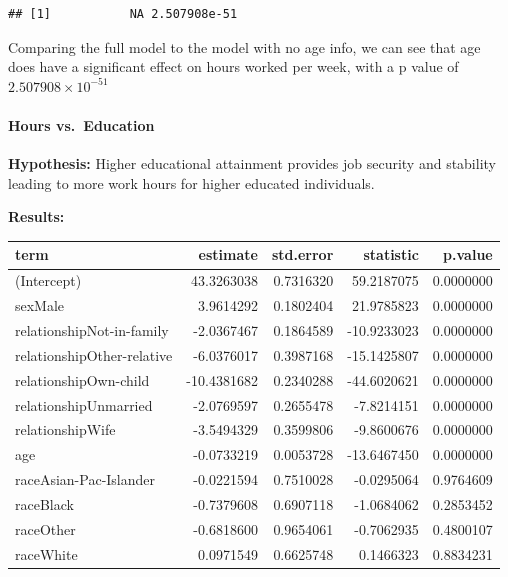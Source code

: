 \documentclass[]{article}
\newenvironment{Shaded}{\begin{snugshade}}{\end{snugshade}}
\newcommand{\KeywordTok}[1]{\textcolor[rgb]{0.13,0.29,0.53}{\textbf{#1}}}
\newcommand{\NormalTok}[1]{#1}
\newcommand{\OperatorTok}[1]{\textcolor[rgb]{0.81,0.36,0.00}{\textbf{#1}}}
\let\oldparagraph\paragraph
\renewcommand{\paragraph}[1]{\oldparagraph{#1}\mbox{}}
\begin{document}
\begin{Shaded}
\end{Shaded}

\begin{verbatim}
## [1]           NA 2.507908e-51
\end{verbatim}

Comparing the full model to the model with no age info, we can see that
age does have a significant effect on hours worked per week, with a p
value of \ensuremath{2.507908\times 10^{-51}}

\hypertarget{hours-vs.-education}{%
\paragraph{Hours vs.~Education}\label{hours-vs.-education}}

\textbf{Hypothesis:} Higher educational attainment provides job security
and stability leading to more work hours for higher educated
individuals.

\textbf{Results:}

\begin{table}[H]
\centering
\begin{tabular}{l|r|r|r|r}
\hline
term & estimate & std.error & statistic & p.value\\
\hline
(Intercept) & 43.3263038 & 0.7316320 & 59.2187075 & 0.0000000\\
\hline
sexMale & 3.9614292 & 0.1802404 & 21.9785823 & 0.0000000\\
\hline
relationshipNot-in-family & -2.0367467 & 0.1864589 & -10.9233023 & 0.0000000\\
\hline
relationshipOther-relative & -6.0376017 & 0.3987168 & -15.1425807 & 0.0000000\\
\hline
relationshipOwn-child & -10.4381682 & 0.2340288 & -44.6020621 & 0.0000000\\
\hline
relationshipUnmarried & -2.0769597 & 0.2655478 & -7.8214151 & 0.0000000\\
\hline
relationshipWife & -3.5494329 & 0.3599806 & -9.8600676 & 0.0000000\\
\hline
age & -0.0733219 & 0.0053728 & -13.6467450 & 0.0000000\\
\hline
raceAsian-Pac-Islander & -0.0221594 & 0.7510028 & -0.0295064 & 0.9764609\\
\hline
raceBlack & -0.7379608 & 0.6907118 & -1.0684062 & 0.2853452\\
\hline
raceOther & -0.6818600 & 0.9654061 & -0.7062935 & 0.4800107\\
\hline
raceWhite & 0.0971549 & 0.6625748 & 0.1466323 & 0.8834231\\
\hline
\end{tabular}
\end{table}
\end{document}
